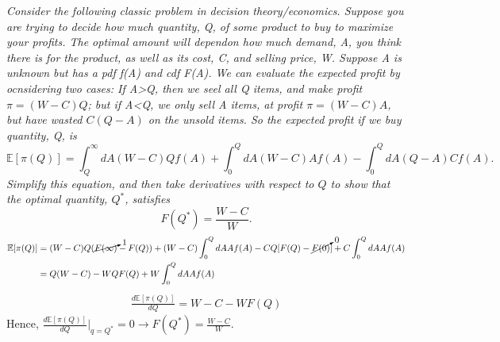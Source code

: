 \begin{example}
		\emph{Consider the following classic problem in decision theory/economics. Suppose you are trying to decide how much quantity, Q, of some product to buy to maximize your profits. The optimal amount will dependon how much demand, A, you think there is for the product, as well as its cost, C, and selling price, W. Suppose A is unknown but has a pdf f(A) and cdf F(A). We can evaluate the expected profit by ocnsidering two cases: If A>Q, then we seel all Q items, and make profit $\pi=(W-C)Q$; but if A<Q, we only sell A items, at profit $\pi=(W-C)A$, but have wasted $C(Q-A)$ on the unsold items. So the expected profit if we buy quantity, Q, is}
		\begin{equation}
			\mathbb{E}[\pi(Q)]=\int_{Q}^\infty dA (W-C)Qf(A)+\int_{0}^Q dA (W-C)Af(A)-\int_{0}^Q dA (Q-A)Cf(A).
		\end{equation}
		\emph{Simplify this equation, and then take derivatives with respect to $Q$ to show that the optimal quantity, $Q^*$, satisfies}
		\begin{equation}
			F(Q^*)=\frac{W-C}{W}.
		\end{equation}
		\begin{equation}
			\begin{split}
				\mathbb{E}[\pi(Q)] &= (W-C)Q(\cancelto{1}{F(\infty)}-F(Q))+(W-C)\int_{0}^Q dAAf(A)-CQ[F(Q)-\cancelto{0}{F(0)}]+C\int_{0}^Q dA Af(A)\\
				&= Q(W-C)-WQF(Q)+W\int_{0}^Q dA Af(A)
			\end{split}
		\end{equation}
		\begin{equation}
			\begin{split}
				\frac{d\mathbb{E}[\pi(Q)]}{dQ} = W-C-WF(Q)
			\end{split}
		\end{equation}
		Hence, $\frac{d\mathbb{E}[\pi(Q)]}{dQ}|_{q=Q^*}=0\rightarrow F(Q^*)=\frac{W-C}{W}$.
	\end{example}
	


